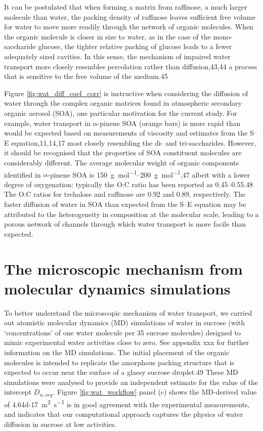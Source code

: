 It can be postulated that when forming a matrix from raffinose, a much larger molecule than water, the packing density of raffinose leaves sufficient free volume for water to move more readily through the network of organic molecules. When the organic molecule is closer in size to water, as in the case of the mono-saccharide glucose, the tighter relative packing of glucose leads to a fewer adequately sized cavities. In this sense, the mechanism of impaired water transport more closely resembles percolation rather than diffusion,43,44 a process that is sensitive to the free volume of the medium.45

Figure \ref{fig:wat_diff_coef_corr} is instructive when considering the diffusion of water through the complex organic matrices found in atmospheric secondary organic aerosol (SOA), one particular motivation for the current study. For example, water transport in $\alpha$-pinene SOA (orange bars) is more rapid than would be expected based on measurements of viscosity and estimates from the S–E equation,11,14,17 most closely resembling the di- and tri-saccharides. However, it should be recognised that the properties of SOA constituent molecules are considerably different. The average molecular weight of organic components identified in $\alpha$-pinene SOA is \SIrange{150}{200}{\gram\per\mole},47 albeit with a lower degree of oxygenation: typically the O:C ratio has been reported as \numrange{0.45}{0.55}.48 The O:C ratios for trehalose and raffinose are \num{0.92} and \num{0.89}, respectively. The faster diffusion of water in SOA than expected from the S–E equation may be attributed to the heterogeneity in composition at the molecular scale, leading to a porous network of channels through which water transport is more facile than expected.

\section{The microscopic mechanism from molecular dynamics simulations}\label{sec:wat_mech}

To better understand the microscopic mechanism of water transport, we carried out atomistic molecular dynamics (MD) simulations of water in sucrose (with ‘concentrations’ of one water molecule per \num{35} sucrose molecules) designed to mimic experimental water activities close to zero. See appendix xxx for further information on the MD simulations. The initial placement of the organic molecules is intended to replicate the amorphous packing structure that is expected to occur near the surface of a glassy sucrose droplet.49 These MD simulations were analysed to provide an independent estimate for the value of the intercept $D_{w,org}$. Figure \ref{fig:wat_workflow} panel (c) shows the MD-derived value of \SI{4.64d-17}{\meter\squared\per\second} is in good agreement with the experimental measurements, and indicates that our computational approach captures the physics of water diffusion in sucrose at low activities.

